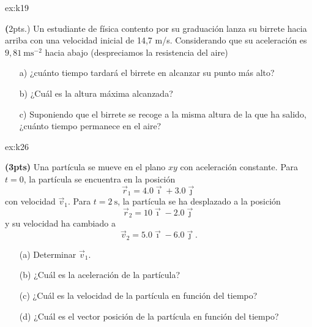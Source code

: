 \begin{multicols}{2}
    \begin{excercise}[][][]{ex:k19}{
        \textbf(2pts.)
        Un estudiante de física contento por su graduación lanza su birrete hacia arriba con una velocidad inicial de 14,7 m/s. Considerando que su aceleración es $9,81 \ \mathrm{ms^{-2}}$ hacia abajo (despreciamos la resistencia del aire)                  
            \begin{itemize}
                \item[a)] ¿cuánto tiempo tardará el birrete en alcanzar su punto más alto? 
                \item[b)] ¿Cuál es la altura máxima alcanzada? 
                \item[c)] Suponiendo que el birrete se recoge a la misma altura de la que ha salido, ¿cuánto tiempo permanece en el aire?           
            \end{itemize}
         }
    \end{excercise}
    \begin{excercise}[][][]{ex:k26}{
         \textbf{(3pts)}
       Una partícula se mueve en el plano $xy$ con aceleración constante. Para $t=0$, la partícula se encuentra en la posición  
       \begin{equation*}
           \vec{r}_1 = 4.0\vec{\imath} + 3.0\vec{\jmath}
       \end{equation*}
       con velocidad $\vec{v}_1$. Para $t=2\ \text{s}$, la partícula se ha desplazado a la posición 
        \begin{equation*}
            \vec{r}_2 = 10 \vec{\imath} - 2.0\vec{\jmath}
        \end{equation*} 
        y su velocidad ha cambiado a 
        \begin{equation*}
            \vec{v}_2 = 5.0\vec{\imath} - 6.0\vec{\jmath}.
        \end{equation*}
        \begin{itemize}
            \item[(a)] Determinar $\vec{v}_1$.
            \item[(b)] ¿Cuál es la aceleración de la partícula?
            \item[(c)] ¿Cuál es la velocidad de la partícula en función del tiempo?
            \item[(d)] ¿Cuál es el vector posición de la partícula en función del tiempo?
        \end{itemize}     
    }
    \end{excercise}

\end{multicols}
